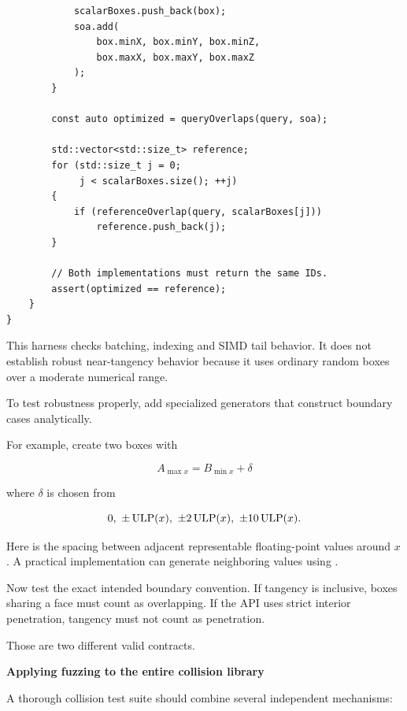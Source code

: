 \begin{verbatim}
            scalarBoxes.push_back(box);
            soa.add(
                box.minX, box.minY, box.minZ,
                box.maxX, box.maxY, box.maxZ
            );
        }

        const auto optimized = queryOverlaps(query, soa);

        std::vector<std::size_t> reference;
        for (std::size_t j = 0;
             j < scalarBoxes.size(); ++j)
        {
            if (referenceOverlap(query, scalarBoxes[j]))
                reference.push_back(j);
        }

        // Both implementations must return the same IDs.
        assert(optimized == reference);
    }
}
\end{verbatim}

This harness checks batching, indexing and SIMD tail behavior. It does not establish robust near-tangency behavior because it uses ordinary random boxes over a moderate numerical range.

To test robustness properly, add specialized generators that construct boundary cases analytically.

For example, create two boxes with

\[
A_{\max x}=B_{\min x}+\delta
\]

where \(\delta\) is chosen from

\[
\\{0,\ \pm\operatorname{ULP}(x),\ \pm2\operatorname{ULP}(x),\ \pm10\operatorname{ULP}(x)\\}.
\]

Here  is the spacing between adjacent representable floating-point values around \(x\). A practical implementation can generate neighboring values using .

Now test the exact intended boundary convention. If tangency is inclusive, boxes sharing a face must count as overlapping. If the API uses strict interior penetration, tangency must not count as penetration.

Those are two different valid contracts.

\textbf{Applying fuzzing to the entire collision library}

A thorough collision test suite should combine several independent mechanisms:

